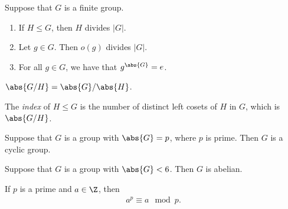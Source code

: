 \documentclass{article}
\begin{document}
\begin{theorem}
    Suppose that $G$ is a finite group.
    \begin{enumerate}
        \item If $H\leq G$, then $H$ divides $|G|$.
        \item Let $g\in G$. Then $o(g)$ divides $|G|$.
        \item For all $g\in G$, we have that $g^{\abs{G}}=e$.
    \end{enumerate}
\end{theorem}

\begin{corollary}
    $\abs{G / H}= \abs{G}/\abs{H}$.
\end{corollary}

\begin{definition}
    The \emph{index} of $H\leq G$ is the number of distinct
    left cosets of $H$ in $G$, which is $\abs{G/H}$.
\end{definition}

\begin{theorem}
    Suppose that $G$ is a group with $\abs{G}=p$, where $p$ is
    prime. Then $G$ is a cyclic group.
\end{theorem}

\begin{corollary}
    Suppose that $G$ is a group with $\abs{G}<6$. Then $G$ is abelian.
\end{corollary}

\begin{theorem}
    If $p$ is a prime and $a\in\Z$, then
    \begin{align*}
        a^{p}\equiv a \mod p.
    \end{align*}
\end{theorem}
\end{document}
